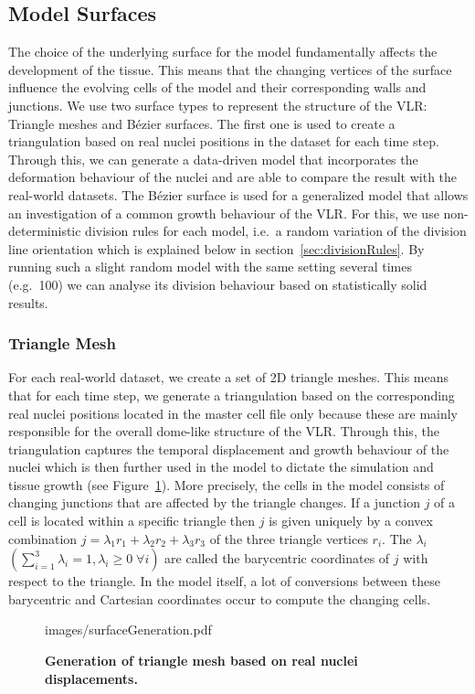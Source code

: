 \documentclass[11pt,a4paper, final]{article}
\begin{document}
\subsection{Model Surfaces}
\noindent
The choice of the underlying surface for the model fundamentally affects the development of the tissue. This means that the changing vertices of the surface influence the evolving cells of the model and their corresponding walls and junctions. We use two surface types to represent the structure of the VLR: Triangle meshes and B\'ezier surfaces. The first one is used to create a triangulation based on real nuclei positions in the dataset for each time step. Through this, we can generate a data-driven model that incorporates the deformation behaviour of the nuclei and are able to compare the result with the real-world datasets. The B\'ezier surface is used for a generalized model that allows an investigation of a common growth behaviour of the VLR. For this, we use non-deterministic division rules for each model, i.e.\ a random variation of the division line orientation which is explained below in section~\ref{sec:divisionRules}. By running such a slight random model with the same setting several times (e.g.\ 100) we can analyse its division behaviour based on statistically solid results.

\subsubsection{Triangle Mesh}
\noindent
For each real-world dataset, we create a set of 2D triangle meshes. This means that for each time step, we generate a triangulation based on the corresponding real nuclei positions located in the master cell file only because these are mainly responsible for the overall dome-like structure of the VLR. Through this, the triangulation captures the temporal displacement and growth behaviour of the nuclei which is then further used in the model to dictate the simulation and tissue growth (see Figure~\ref{fig:surfaceGeneration}). More precisely, the cells in the model consists of changing junctions that are affected by the triangle changes. If a junction $j$ of a cell is located within a specific triangle then $j$ is given uniquely by a convex combination $j = \lambda_1 r_1 + \lambda_2 r_2 + \lambda_3 r_3$ of the three triangle vertices $r_i$. The $\lambda_i$ $\left( \sum_{i=1}^{3} \lambda_i = 1, \lambda_i \geq 0 \; \forall i \right)$ are called the barycentric coordinates of $j$ with respect to the triangle. In the model itself, a lot of conversions between these barycentric and Cartesian coordinates occur to compute the changing cells.
%
\begin{figure}[htbp]
	\begin{center}
		\begin{overpic}[width=1.\linewidth]{images/surfaceGeneration.pdf}
		\end{overpic}
\caption[Generation of triangle mesh based on real nuclei displacements.]
{
{\bf Generation of triangle mesh based on real nuclei displacements.}
}
	\label{fig:surfaceGeneration}
	\end{center}
\end{figure}
%
\end{document}
